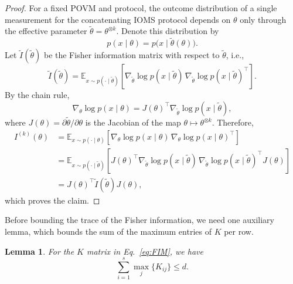 \documentclass[12pt]{article}
\newtheorem{lemma}{Lemma}
\begin{document}
\begin{proof}
For a fixed POVM and protocol, the outcome distribution of a single measurement for the concatenating IOMS protocol depends on $\theta$ only through the effective parameter $\tilde{\theta} = \theta^{\otimes k}$. Denote this distribution by
\begin{equation}
    p(x \mid \theta) = p\bigl(x \mid \tilde{\theta}(\theta)\bigr).
\end{equation}
Let $\tilde{I}(\tilde{\theta})$ be the Fisher information matrix with respect to $\tilde{\theta}$, i.e.,
\begin{equation}
    \tilde{I}(\tilde{\theta})
    = \mathbb{E}_{x \sim p(\cdot \mid \tilde{\theta})}
    \left[
        \nabla_{\tilde{\theta}} \log p(x \mid \tilde{\theta})\,
        \nabla_{\tilde{\theta}} \log p(x \mid \tilde{\theta})^{\top}
    \right].
\end{equation}
By the chain rule,
\begin{equation}
    \nabla_{\theta} \log p(x \mid \theta)
    = J(\theta)^{\top} \nabla_{\tilde{\theta}} \log p(x \mid \tilde{\theta}),
\end{equation}
where $J(\theta) = \partial \tilde{\theta} / \partial \theta$ is the Jacobian of the map $\theta \mapsto \theta^{\otimes k}$. Therefore,
\begin{equation}
\begin{split}
    I^{(k)}(\theta)
    &= \mathbb{E}_{x \sim p(\cdot \mid \theta)}
    \left[
        \nabla_{\theta} \log p(x \mid \theta)\,
        \nabla_{\theta} \log p(x \mid \theta)^{\top}
    \right] \\
    &= \mathbb{E}_{x \sim p(\cdot \mid \tilde{\theta})}
    \left[
        J(\theta)^{\top} \nabla_{\tilde{\theta}} \log p(x \mid \tilde{\theta})\,
        \nabla_{\tilde{\theta}} \log p(x \mid \tilde{\theta})^{\top} J(\theta)
    \right] \\
    &= J(\theta)^{\top} \tilde{I}(\tilde{\theta}) J(\theta),
\end{split}
\end{equation}
which proves the claim.
\end{proof}

Before bounding the trace of the Fisher information, we need one auxiliary lemma, which bounds the sum of the maximum entries of $K$ per row.

\begin{lemma}\label{lm:suc}
For the $K$ matrix in Eq.~\ref{eq:FIM}, we have
\begin{equation}
    \sum_{i=1}^s \max_j \{K_{ij}\} \leq d.
\end{equation}
\end{lemma}
\end{document}

